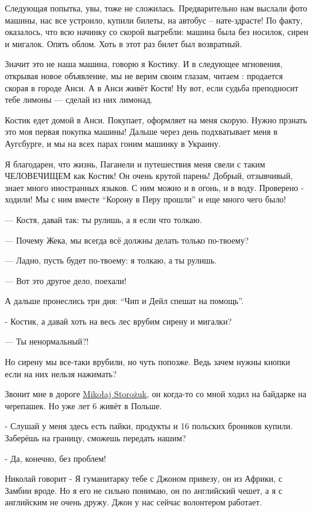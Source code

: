 Следующая попытка, увы, тоже не сложилась. Предварительно нам выслали фото
машины, нас все устроило,  купили билеты, на автобус – нате-здрасте! По факту,
оказалось, что всю начинку со скорой выгребли: машина была без носилок, сирен и
мигалок. Опять облом. Хоть в этот раз билет был возвратный. 

Значит это не наша машина, говорю я Костику. И в следующее мгновения, открывая
новое объявление, мы не верим своим глазам, читаем : продается скорая в городе
Анси.  А в Анси живёт Костя! Ну вот, если судьба преподносит тебе лимоны —
сделай из них лимонад.

Костик едет домой в Анси. Покупает, оформляет на меня скорую. Нужно прзнать это
моя первая покупка машины! Дальше через день подхватывает меня в Аугсбурге, и
мы на всех парах гоним машинку в Украину.

Я благодарен, что жизнь, Паганели и путешествия меня свели с таким ЧЕЛОВЕЧИЩЕМ
как Костик! Он очень крутой парень! Добрый, отзывчивый, знает много иностранных
языков. С ним можно и в огонь, и в воду. Проверено - ходили! Мы с ним вместе
\enquote{Корону в Перу прошли} и еще много чего было!

— Костя, давай так: ты рулишь, а я если что толкаю.

— Почему Жека, мы всегда всё должны делать только по-твоему?

— Ладно, пусть будет по-твоему: я толкаю, а ты рулишь.

— Вот это другое дело, поехали!

А дальше пронеслись три дня: \enquote{Чип и Дейл спешат на помощь}.  

- Костик, а давай хоть на весь лес врубим сирену и мигалки?

— Ты ненормальный?! 

Но сирену мы все-таки врубили, но чуть попозже. Ведь зачем нужны кнопки если на
них нельзя нажимать?

Звонит мне в дороге
\href{https://www.facebook.com/profile.php?id=100004658208358}{Mikołaj
Storożuk}, он когда-то со мной ходил на байдарке на черепашек. Но уже лет 6
живёт в Польше.

- Слушай у меня здесь есть пайки, продукты и 16 польских броников купили. Заберёшь на границу, сможешь передать нашим? 

- Да, конечно, без проблем! 

Николай говорит - Я гуманитарку тебе с Джоном привезу, он из Африки, с Замбии
вроде. Но я его не сильно понимаю, он по английский чешет, а я с английским не
очень дружу. Джон у нас сейчас волонтером работает. 

